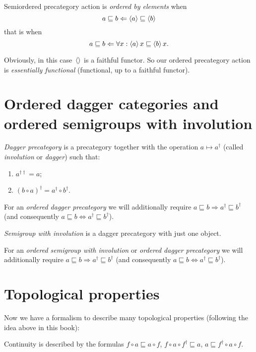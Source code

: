 Semiordered precategory action is \emph{ordered by elements} when \[ a\sqsubseteq b \Leftarrow \left\langle a\right\rangle\sqsubseteq \left\langle b\right\rangle \] that is when \[ a\sqsubseteq b \Leftarrow \forall x:\left\langle a\right\rangle x\sqsubseteq\left\langle b\right\rangle x. \]

Obviously, in this case~$\left\langle \right\rangle$ is a faithful functor. So our ordered precategory action is \emph{essentially functional} (functional, up to a faithful functor).

\chapter{Ordered dagger categories and ordered semigroups with involution}

\begin{defn}
\emph{Dagger precategory} is a precategory together with the operation $a\mapsto a^{\dagger}$ (called \emph{involution} or \emph{dagger}) such that:
\begin{enumerate}
\item $a^{\dagger\dagger} = a$;
\item $(b\circ a)^{\dagger} = a^{\dagger}\circ b^{\dagger}$.
\end{enumerate}
\end{defn}

For an \emph{ordered dagger precategory} we will additionally require $a\sqsubseteq b\Rightarrow a^{\dagger}\sqsubseteq b^{\dagger}$ (and consequently $a\sqsubseteq b\Leftrightarrow a^{\dagger}\sqsubseteq b^{\dagger}$).

\begin{defn}
\emph{Semigroup with involution} is a dagger precategory with just one object.
\end{defn}

For an \emph{ordered semigroup with involution} or \emph{ordered dagger precategory} we will additionally require $a\sqsubseteq b\Rightarrow a^{\dagger}\sqsubseteq b^{\dagger}$ (and consequently $a\sqsubseteq b\Leftrightarrow a^{\dagger}\sqsubseteq b^{\dagger}$).

\chapter{Topological properties}

Now we have a formalism to describe many topological properties (following the idea above in this book):

Continuity is described by the formulas $f\circ a\sqsubseteq a\circ f$, $f\circ a\circ f^{\dagger}\sqsubseteq a$, $a\sqsubseteq f^{\dagger}\circ a\circ f$.

